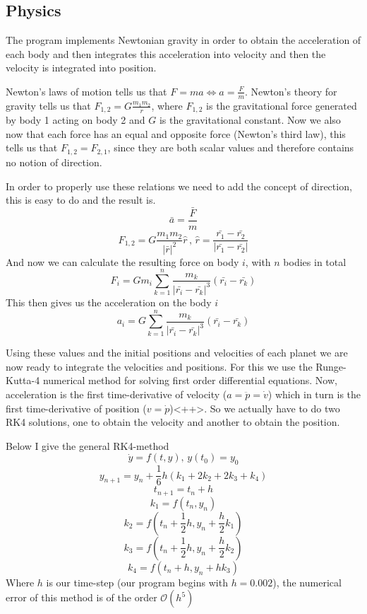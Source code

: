 \documentclass[a4paper,12pt]{article} \usepackage{graphicx}
\begin{document}
\subsection{Physics}
The program implements Newtonian gravity in order to obtain the acceleration of each body and then integrates this acceleration into velocity and then the velocity is integrated into position.

Newton's laws of motion tells us that $F=ma \Leftrightarrow a = \frac{F}{m}$. Newton's theory for gravity tells us that $F_{1,2} = G\frac{m_1m_2}{r}$, where $F_{1,2}$ is the gravitational force generated by body 1 acting on body 2 and $G$ is the gravitational constant. Now we also now that each force has an equal and opposite force (Newton's third law), this tells us that $F_{1,2} = F_{2,1}$, since they are both scalar values and therefore contains no notion of direction.

In order to properly use these relations we need to add the concept of direction, this is easy to do and the result is.
\[
\bar{a} = \frac{\bar{F}}{m}
\]
\[
F_{1,2} = G\frac{m_1m_2}{|\bar{r}|^2}\hat{r} \, , \, \hat{r} = \frac{\bar{r_1} - \bar{r_2}}{|\bar{r_1} - \bar{r_2}|}
\]
And now we can calculate the resulting force on body $i$, with $n$ bodies in total
\[
F_i = G m_i\sum_{k=1}^n \frac{m_k}{|\bar{r_i} - \bar{r_k}|^3}\left( \bar{r_i} - \bar{r_k} \right)
\]
This then gives us the acceleration on the body $i$
\[
a_i = G \sum_{k=1}^n \frac{m_k}{|\bar{r_i} - \bar{r_k}|^3}\left( \bar{r_i} - \bar{r_k} \right)
\]

Using these values and the initial positions and velocities of each planet we are now ready to integrate the velocities and positions. For this we use the Runge-Kutta-4 numerical method for solving first order differential equations. Now, acceleration is the first time-derivative of velocity ($a=\ddot{p} = \dot{v}$) which in turn is the first time-derivative of position ($v=\dot{p}$)<++>. So we actually have to do two RK4 solutions, one to obtain the velocity and another to obtain the position.

Below I give the general RK4-method
\[
\dot{y}=f(t,y),\,y(t_0)=y_0
\]
\[
y_{n+1} = y_n + \frac{1}{6}h\left( k_1 + 2k_2 + 2k_3 + k_4\right)
\]
\[
t_{n+1} = t_n +h
\]
\[
k_1 = f(t_n,y_n)
\]
\[
k_2 = f(t_n + \frac{1}{2}h,y_n + \frac{h}{2}k_1)
\]
\[
k_3 = f(t_n + \frac{1}{2}h,y_n + \frac{h}{2}k_2)
\]
\[
k_4 = f(t_n + h,y_n + hk_3)
\]
Where $h$ is our time-step (our program begins with $h = 0.002$), the numerical error of this method is of the order $\mathcal{O}(h^5)$
\end{document}
